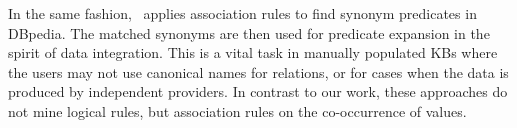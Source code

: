 In the same fashion,~\cite{Ziawasch2013a} applies association rules to find synonym predicates in DBpedia. The matched synonyms
are then used for predicate expansion in the spirit of data integration.
This is a vital task in manually populated KBs where the users may not use canonical names for relations,
or for cases when the data is produced by
independent providers. In contrast to our work, these approaches do not mine logical rules, but association rules on the co-occurrence of values.
